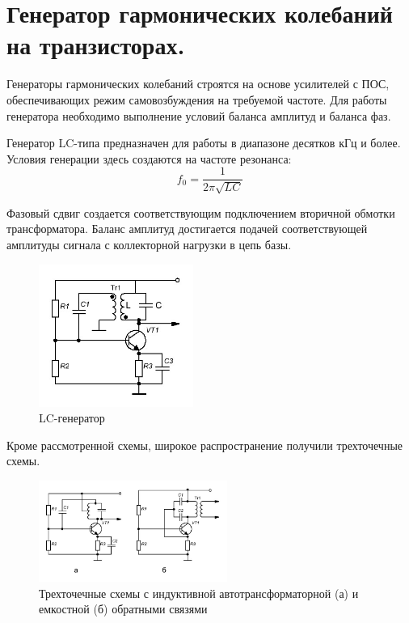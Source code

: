 \documentclass[unicode, 12pt, a4paper, oneside]{article}
\begin{document}
\section{Генератор гармонических колебаний на транзисторах.}

Генераторы гармонических колебаний строятся на основе усилителей с ПОС, обеспечивающих режим самовозбуждения на требуемой частоте. Для работы генератора необходимо выполнение условий баланса амплитуд и баланса фаз.

Генератор LC-типа предназначен для работы в диапазоне десятков кГц и более. Условия генерации здесь создаются на частоте резонанса:
\begin{displaymath}
f_0 = \frac{1}{2 \pi \sqrt{L C}}
\end{displaymath}

Фазовый сдвиг создается соответствующим подключением вторичной обмотки трансформатора. Баланс амплитуд достигается подачей соответствующей амплитуды сигнала с коллекторной нагрузки в цепь базы.

\begin{figure}[H]
\centering
\includegraphics[width=0.45\textwidth]{150_lc.jpg}
\caption{LC-генератор}
\end{figure}

Кроме рассмотренной схемы, широкое распространение получили трехточечные схемы.

\begin{figure}[H]
\centering
\includegraphics[width=0.55\textwidth]{150_3dot.jpg}
\caption{Трехточечные схемы с индуктивной автотрансформаторной (а) и емкостной (б) обратными связями}
\end{figure}
\end{document}
